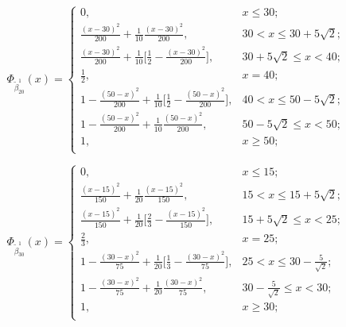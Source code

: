 \[\Phi_{\tilde{\beta}_{20}^1}(x)=\left\{
\begin{array}{ll}
	0, & x\leq 30;\\
	\frac{(x-30)^2}{200}+\frac{1}{10}\frac{(x-30)^2}{200}, & 30<x\leq 30+5\sqrt{2};\\
	\frac{(x-30)^2}{200}+\frac{1}{10}\big[\frac{1}{2}-\frac{(x-30)^2}{200}\big], & 30+5\sqrt{2}\leq x<40;\\
	\frac{1}{2}, & x=40;\\
	1-\frac{(50-x)^2}{200}+\frac{1}{10}\big[\frac{1}{2}-\frac{(50-x)^2}{200}\big], & 40<x\leq 50-5\sqrt{2};\\
	1-\frac{(50-x)^2}{200}+\frac{1}{10}\frac{(50-x)^2}{200}, &  50-5\sqrt{2}\leq x<50;\\
	1, & x\geq 50;\\
\end{array}
\right.
\]

\[\Phi_{\tilde{\beta}_{30}^1}(x)=\left\{
\begin{array}{ll}
	0, & x\leq 15;\\
	\frac{(x-15)^2}{150}+\frac{1}{20}\frac{(x-15)^2}{150}, & 15<x\leq 15+5\sqrt{2};\\
	\frac{(x-15)^2}{150}+\frac{1}{20}\big[\frac{2}{3}-\frac{(x-15)^2}{150}\big], & 15+5\sqrt{2}\leq x<25;\\
	\frac{2}{3}, & x=25;\\
	1-\frac{(30-x)^2}{75}+\frac{1}{20}\big[\frac{1}{3}-\frac{(30-x)^2}{75}\big], & 25<x\leq 30-\frac{5}{\sqrt{2}};\\
	1-\frac{(30-x)^2}{75}+\frac{1}{20}\frac{(30-x)^2}{75}, &  30-\frac{5}{\sqrt{2}}\leq x<30;\\
	1, & x\geq 30;\\
\end{array}
\right.
\]

